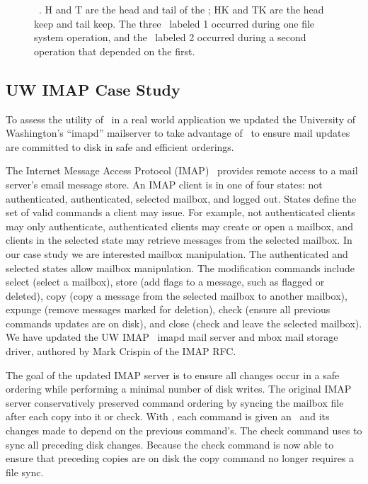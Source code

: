 \begin{figure}[htb]
\caption{\label{fig:opgroup-chdescs} \Opgroup\ \chdescs. H and T are the head
and tail of the \opgroup; HK and TK are the head keep and tail keep. The three
\chdescs\ labeled 1 occurred during one file system operation, and the \chdesc\
labeled 2 occurred during a second operation that depended on the first.}
\end{figure}

\subsection{UW IMAP Case Study}
\label{sec:opgroup:uwimap}


To assess the utility of \opgroups\ in a real world application we
updated the University of Washington's ``imapd'' mailserver to take
advantage of \opgroups\ to ensure mail updates are committed to disk
in safe and efficient orderings.

The Internet Message Access Protocol (IMAP)~\cite{rfc3501} provides
remote access to a mail server's email message store. An IMAP client
is in one of four states: not authenticated, authenticated, selected
mailbox, and logged out. States define the set of valid commands a
client may issue. For example, not authenticated clients may only
authenticate, authenticated clients may create or open a mailbox, and
clients in the selected state may retrieve messages from the selected
mailbox. In our case study we are interested mailbox manipulation. The
authenticated and selected states allow mailbox manipulation. The
modification commands include select (select a mailbox), store (add
flags to a message, such as flagged or deleted), copy (copy a message
from the selected mailbox to another mailbox), expunge (remove
messages marked for deletion), check (ensure all previous commands
updates are on disk), and close (check and leave the selected
mailbox). We have updated the UW IMAP~\cite{uwimap} imapd mail server
and mbox mail storage driver, authored by Mark Crispin of the IMAP RFC.
\todo{Be more explicitly about which commands sync}

The goal of the updated IMAP server is to ensure all changes occur in
a safe ordering while performing a minimal number of disk writes.  The
original IMAP server conservatively preserved command ordering by
syncing the mailbox file after each copy into it or check. With
\opgroups, each command is given an \opgroup\ and its changes made to
depend on the previous command's. The check command uses \opgroupSync
to sync all preceding disk changes. Because the check command is now
able to ensure that preceding copies are on disk the copy command no
longer requires a file sync.

